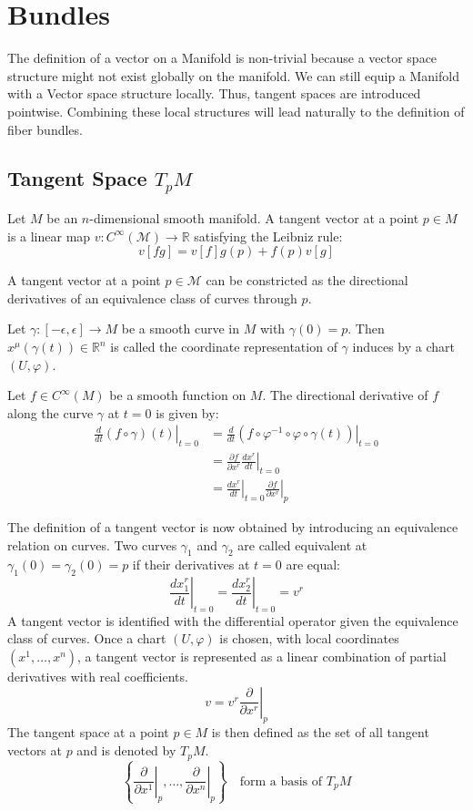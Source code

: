 
\chapter{Bundles}

  The definition of a vector on a Manifold is non-trivial because a vector space structure might not exist globally on the manifold. We can still equip a Manifold with a Vector space structure locally. Thus, tangent spaces are introduced pointwise. Combining these local structures will lead naturally to the definition of fiber bundles.

\section{Tangent Space $T_pM$}

  Let $M$ be an $n$-dimensional smooth manifold. A tangent vector at a point $p \in M$ is a linear map $v: C^\infty(\mathcal{M}) \to \mathbb{R}$ satisfying the Leibniz rule\cite{FredericSchullerDifferentialstructurespivotalconcepttangentvectorspacesLec09FredericSchuller2015}:
 \[ v[fg] = v[f]g(p) + f(p)v[g] \]

  A tangent vector at a point $p \in \mathcal{M}$ can be constricted as the directional derivatives of an equivalence class of curves through $p$\cite{NakaharaGeometrytopologyphysics2005}.

  Let $\gamma: [-\epsilon, \epsilon] \to M$ be a smooth curve in $M$ with $\gamma(0)=p$. Then $x^\mu(\gamma(t)) \in \mathbb{R}^n$ is called the coordinate representation of $\gamma$ induces by a chart $(U, \varphi)$.

Let $f \in C^\infty(M)$ be a smooth function on $M$. The directional derivative of $f$ along the curve $\gamma$ at $t=0$ is given by:
\begin{align*}
\left. \frac{d}{dt} (f \circ \gamma)(t) \right|_{t=0}
  &= \left. \frac{d}{dt} \left( f\circ \varphi^{-1}\circ\varphi\circ\gamma(t) \right) \right|_{t=0} \\
&= \left. \frac{\partial f}{\partial x^r} \frac{d x^r}{dt} \right|_{t=0} \\
&= \left. \frac{d x^r}{dt} \right|_{t=0} \left. \frac{\partial f}{\partial x^r} \right|_p
\end{align*}

The definition of a tangent vector is now obtained by introducing an equivalence relation on curves. Two curves $\gamma_1$ and $\gamma_2$ are called equivalent at $\gamma_1(0)=\gamma_2(0)=p$ if their derivatives at $t=0$ are equal:
\[
\left. \frac{d x_1^r}{dt} \right|_{t=0}
= \left. \frac{d x_2^r}{dt} \right|_{t=0}
= v^r
\]
A tangent vector is identified with the differential operator given the equivalence class of curves. Once a chart $(U, \varphi)$ is chosen, with local coordinates $(x^1, \dots, x^n)$, a tangent vector is represented as a linear combination of partial derivatives with real coefficients.
\[
v = v^r \left. \frac{\partial}{\partial x^r} \right|_p
\]
The tangent space at a point $p \in M$ is then defined as the set of all tangent vectors at $p$ and is denoted by $T_pM$.
\[
\left\{ \left. \frac{\partial}{\partial x^1} \right|_p, \dots, \left. \frac{\partial}{\partial x^n} \right|_p \right\} \quad \text{form a basis of } T_pM
\]



